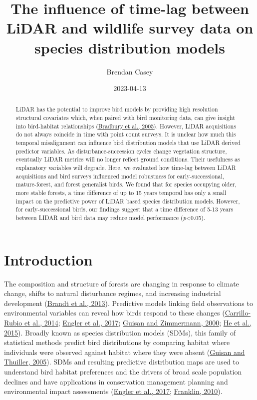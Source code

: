 \documentclass[
  12pt,
]{article}
\title{The influence of time-lag between LiDAR and wildlife survey data on species distribution models}
\author{Brendan Casey}
\date{2023-04-13}
\begin{document}
\maketitle
\begin{abstract}
LiDAR has the potential to improve bird models by providing high resolution structural covariates which, when paired with bird monitoring data, can give insight into bird-habitat relationships (\protect\hyperlink{ref-Bradbury2005}{Bradbury et al., 2005}). However, LiDAR acquisitions do not always coincide in time with point count surveys. It is unclear how much this temporal misalignment can influence bird distribution models that use LiDAR derived predictor variables. As disturbance-succession cycles change vegetation structure, eventually LiDAR metrics will no longer reflect ground conditions. Their usefulness as explanatory variables will degrade. Here, we evaluated how time-lag between LiDAR acquisitions and bird surveys influenced model robustness for early-successional, mature-forest, and forest generalist birds. We found that for species occupying older, more stable forests, a time difference of up to 15 years temporal has only a small impact on the predictive power of LiDAR based species distribution models. However, for early-successional birds, our findings suggest that a time difference of 5-13 years between LIDAR and bird data may reduce model performance (\emph{p}\textless0.05).
\end{abstract}

{
\hypersetup{linkcolor=}
\setcounter{tocdepth}{2}
\tableofcontents
}
\hypertarget{introduction}{%
\section{Introduction}\label{introduction}}

The composition and structure of forests are changing in response to climate change, shifts to natural disturbance regimes, and increasing industrial development (\protect\hyperlink{ref-Brandt2013}{Brandt et al., 2013}). Predictive models linking field observations to environmental variables can reveal how birds respond to these changes (\protect\hyperlink{ref-Carrillo-Rubio2014}{Carrillo-Rubio et al., 2014}; \protect\hyperlink{ref-englerAvianSDMsCurrent2017}{Engler et al., 2017}; \protect\hyperlink{ref-guisanPredictiveHabitatDistribution2000}{Guisan and Zimmermann, 2000}; \protect\hyperlink{ref-He2015}{He et al., 2015}). Broadly known as species distribution models (SDMs), this family of statistical methods predict bird distributions by comparing habitat where individuals were observed against habitat where they were absent (\protect\hyperlink{ref-Guisan2005}{Guisan and Thuiller, 2005}). SDMs and resulting predictive distribution maps are used to understand bird habitat preferences and the drivers of broad scale population declines and have applications in conservation management planning and environmental impact assessments (\protect\hyperlink{ref-englerAvianSDMsCurrent2017}{Engler et al., 2017}; \protect\hyperlink{ref-franklinMappingSpeciesDistributions2010}{Franklin, 2010}).
\end{document}
